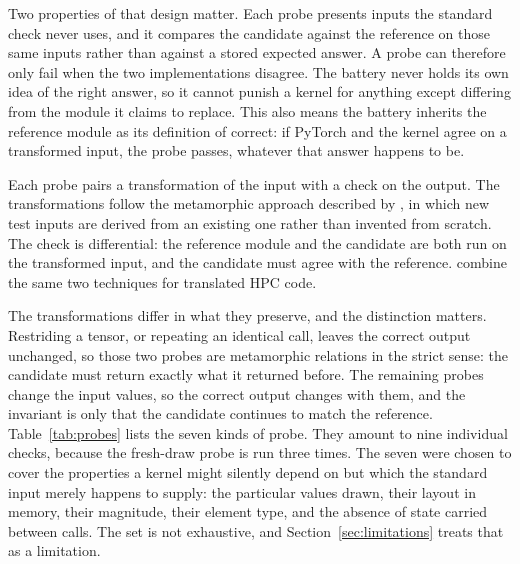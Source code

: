 \documentclass[12pt]{article}
\begin{document}
Two properties of that design matter. Each probe presents inputs the standard
check never uses, and it compares the candidate against the reference on those
same inputs rather than against a stored expected answer. A probe can therefore
only fail when the two implementations disagree. The battery never holds its own
idea of the right answer, so it cannot punish a kernel for anything except
differing from the module it claims to replace. This also means the battery
inherits the reference module as its definition of correct: if PyTorch and the
kernel agree on a transformed input, the probe passes, whatever that answer
happens to be.

Each probe pairs a transformation of the input with a check on the output. The
transformations follow the metamorphic approach described by
\citet{segura2016metamorphic}, in which new test inputs are derived from an
existing one rather than invented from scratch. The check is differential: the
reference module and the candidate are both run on the transformed input, and
the candidate must agree with the reference. \citet{ludwig2026kaizen} combine
the same two techniques for translated HPC code.

The transformations differ in what they preserve, and the distinction matters.
Restriding a tensor, or repeating an identical call, leaves the correct output
unchanged, so those two probes are metamorphic relations in the strict sense:
the candidate must return exactly what it returned before. The remaining probes
change the input values, so the correct output changes with them, and the
invariant is only that the candidate continues to match the reference.
Table~\ref{tab:probes} lists the seven kinds of probe. They amount to nine
individual checks, because the fresh-draw probe is run three times. The seven
were chosen to cover the properties a kernel might silently depend on but which
the standard input merely happens to supply: the particular values drawn, their
layout in memory, their magnitude, their element type, and the absence of state
carried between calls. The set is not exhaustive, and
Section~\ref{sec:limitations} treats that as a limitation.
\end{document}
